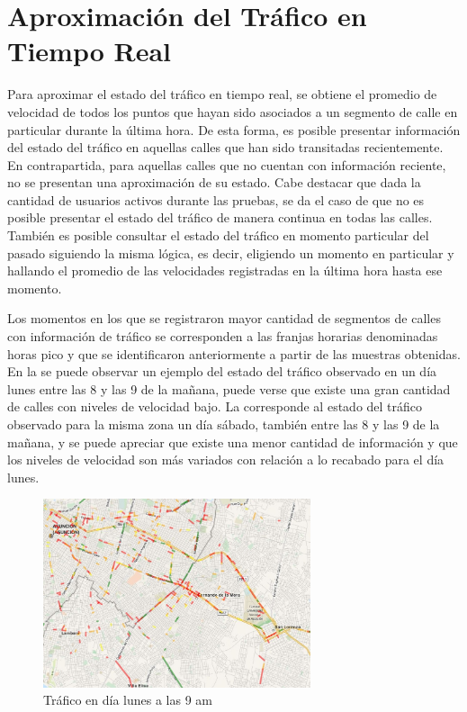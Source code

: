 \section{Aproximación del Tráfico en Tiempo Real}

Para aproximar el estado del tráfico en tiempo real, se obtiene el promedio de velocidad de todos los puntos que hayan sido asociados a un segmento de calle en particular durante la última hora. De esta forma, es posible presentar información del estado del tráfico en aquellas calles que han sido transitadas recientemente. En contrapartida, para aquellas calles que no cuentan con información reciente, no se presentan una aproximación de su estado. Cabe destacar que dada la cantidad de usuarios activos durante las pruebas, se da el caso de que no es posible presentar el estado del tráfico de manera continua en todas las calles. También es posible consultar el estado del tráfico en momento particular del pasado siguiendo la misma lógica, es decir, eligiendo un momento en particular y hallando el promedio de las velocidades registradas en la última hora hasta ese momento.

Los momentos en los que se registraron mayor cantidad de segmentos de calles con información de tráfico se corresponden a las franjas horarias denominadas horas pico y que se identificaron anteriormente a partir de las muestras obtenidas. En la  se puede observar un ejemplo del estado del tráfico observado en un día lunes entre las 8 y las 9 de la mañana, puede verse que existe una gran cantidad de calles con niveles de velocidad bajo. La  corresponde al estado del tráfico observado para la misma zona un día sábado, también entre las 8 y las 9 de la mañana, y se puede apreciar que existe una menor cantidad de información y que los niveles de velocidad son más variados con relación a lo recabado para el día lunes.

\begin{figure}[!ht]
	\centering
	\includegraphics[width=0.7\textwidth]{capitulos/7/figuras/figura6.jpg}
	\caption{\label{fig:trafico_lunes} Tráfico en día lunes a las 9 am}	
\end{figure}

